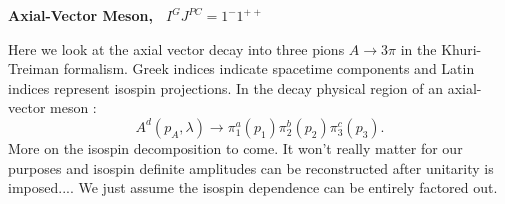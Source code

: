 \documentclass[aps,prd,amsmath,amssymb,superscriptaddress,onecolumn,
nofootinbib,showpacs,preprintnumbers]{revtex4-1}
\begin{document}
\newcommand{\mand}{\qquad \text{ and } \qquad}
\newcommand{\Disc}{\text{Disc }}

\begin{center}
\large \textbf{Axial-Vector Meson, \, \(I^G J^{PC} = 1^-1^{++}\)}
\end{center}

Here we look at the axial vector decay into three pions \(A \to 3\pi\) in the Khuri-Treiman formalism. Greek indices indicate spacetime components and Latin indices represent isospin projections. In the decay physical region of an axial-vector meson :
  \begin{equation}
    A^d(p_A, \lambda) \rightarrow \pi_1^a(p_1) \pi_2^b(p_2) \pi^c_3(p_3).
  \end{equation}
More on the isospin decomposition to come. It won't really matter for our purposes and isospin definite amplitudes can be reconstructed after unitarity is imposed.... We just assume the isospin dependence can be entirely factored out.
\end{document}
